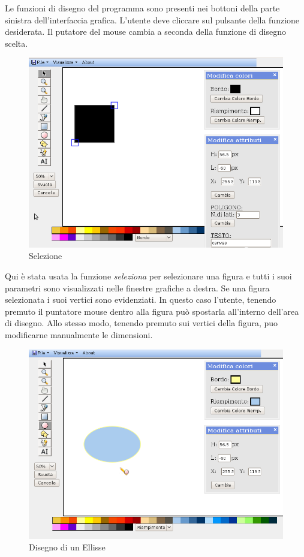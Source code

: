 Le funzioni di disegno del programma sono presenti nei bottoni della parte sinistra dell'interfaccia grafica. L'utente deve cliccare sul pulsante della funzione desiderata. Il putatore del mouse cambia a seconda della funzione di disegno scelta.

\begin{figure}[!ht]
\centering
\includegraphics[scale=0.4]{images/selezione.png}
\caption{Selezione}
\end{figure} 

Qui \`e stata usata la funzione \textit{seleziona} per selezionare una figura e tutti i suoi parametri sono visualizzati nelle finestre grafiche a destra. Se una figura  selezionata i suoi vertici sono evidenziati. In questo caso l'utente, tenendo premuto il puntatore mouse dentro alla figura pu\`o spostarla all'interno dell'area di disegno. Allo stesso modo, tenendo premuto sui vertici della figura, puo modificarne manualmente le dimensioni.

\begin{figure}[!ht]
\centering
\includegraphics[scale=0.4]{images/ellisse.png}
\caption{Disegno di un Ellisse}
\end{figure} 

